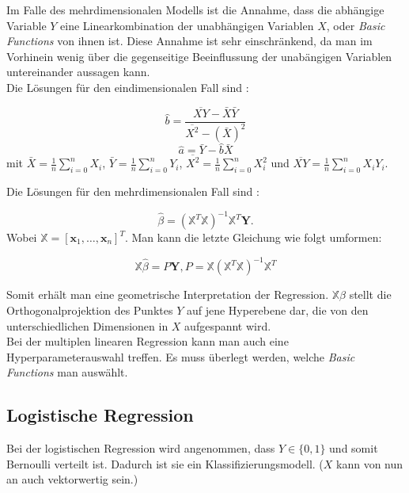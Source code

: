 Im Falle des mehrdimensionalen Modells ist die Annahme, dass die \glqq abh\"angige\grqq{} Variable $Y$ eine Linearkombination der \glqq unabh\"angigen\grqq{} Variablen
$X$, oder \textit{Basic Functions} von ihnen ist. Diese Annahme ist sehr einschr\"ankend, da man im Vorhinein wenig \"uber die gegenseitige Beeinflussung der 
\glqq unab\"angigen\grqq{} Variablen untereinander aussagen kann. \\

Die L\"osungen f\"ur den eindimensionalen Fall sind \cite{wasserman}:

$$ \hat{b} = \frac{\overline{XY} - \bar{X}\bar{Y}}{\overline{X^2} - (\bar{X})^2} $$
$$ \hat{a} = \bar{Y} - \hat{b}\bar{X} $$
mit $\bar{X} = \frac{1}{n} \sum_{i = 0}^n X_i$, $\bar{Y} = \frac{1}{n} \sum_{i = 0}^n Y_i$, $\overline{X^2} = \frac{1}{n} \sum_{i = 0}^n X_i^2$ und $\overline{XY} = \frac{1}{n} \sum_{i = 0}^n X_iY_i$.

Die L\"osungen f\"ur den mehrdimensionalen Fall sind \cite{wasserman}: 

$$  \hat{\beta} = (\mathbb{X}^T\mathbb{X})^{-1}\mathbb{X}^T\mathbf{Y} .$$
Wobei $\mathbb{X} = [\mathbf{x}_1, \dots, \mathbf{x}_n]^T$. Man kann die letzte Gleichung wie folgt umformen:

$$ \mathbb{X}\hat{\beta} = P\mathbf{Y}, P = \mathbb{X}(\mathbb{X}^T\mathbb{X})^{-1}\mathbb{X}^T $$

Somit erh\"alt man eine geometrische Interpretation der Regression. $\mathbb{X}\hat{\beta}$ stellt die Orthogonalprojektion des Punktes $Y$ auf jene
Hyperebene dar, die von den unterschiedlichen Dimensionen in $X$ aufgespannt wird. \\

Bei der multiplen linearen Regression kann man auch eine Hyperparameterauswahl treffen. Es muss \"uberlegt werden, welche 
\textit{Basic Functions} man ausw\"ahlt. 






























\subsection{Logistische Regression}
Bei der logistischen Regression wird angenommen, dass $Y \in \{0,1\}$ und somit Bernoulli verteilt ist.
Dadurch ist sie ein Klassifizierungsmodell. ($X$ kann von nun an auch vektorwertig sein.)  \\

